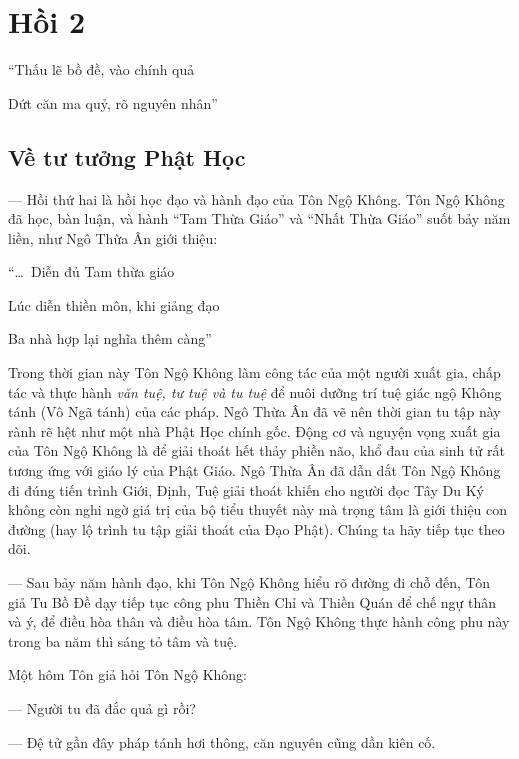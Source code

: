 \chapter{Hồi 2} %
\label{cha:hoi_2}


\begin{itshape}
``Thấu lẽ bồ đề, vào chính quả

Dứt căn ma quỷ, rõ nguyên nhân''
\end{itshape}

\section{Về tư tưởng Phật Học} %
\label{sec:2_tu_tuong_phat_hoc}

— Hồi thứ hai là hồi học đạo và hành đạo của Tôn Ngộ Không. Tôn Ngộ Không đã học, bàn luận, và hành ``Tam Thừa Giáo'' và ``Nhất Thừa Giáo'' suốt bảy năm liền, như Ngô Thừa Ân giới thiệu:

\begin{itshape}
``\ldots ~Diễn đủ Tam thừa giáo

Lúc diễn thiền môn, khi giảng đạo

Ba nhà hợp lại nghĩa thêm càng''
\end{itshape}

Trong thời gian này Tôn Ngộ Không làm công tác của một người xuất gia, chấp tác và thực hành \emph{văn tuệ, tư tuệ và tu tuệ} để nuôi dưỡng trí tuệ giác ngộ Không tánh (Vô Ngã tánh) của các pháp. Ngô Thừa Ân đã vẽ nên thời gian tu tập này rành rẽ hệt như một nhà Phật Học chính gốc. Động cơ và nguyện vọng xuất gia của Tôn Ngộ Không là để giải thoát hết thảy phiền não, khổ đau của sinh tử rất tương ứng với giáo lý của Phật Giáo. Ngô Thừa Ân đã dẫn dắt Tôn Ngộ Không đi đúng tiến trình Giới, Định, Tuệ giải thoát khiến cho người đọc Tây Du Ký không còn nghi ngờ giá trị của bộ tiểu thuyết này mà trọng tâm là giới thiệu con đường (hay lộ trình tu tập giải thoát của Đạo Phật). Chúng ta hãy tiếp tục theo dõi.

— Sau bảy năm hành đạo, khi Tôn Ngộ Không hiểu rõ đường đi chỗ đến, Tôn giả Tu Bồ Đề dạy tiếp tục công phu Thiền Chỉ và Thiền Quán để chế ngự thân và ý, để điều hòa thân và điều hòa tâm. Tôn Ngộ Không thực hành công phu này trong ba năm thì sáng tỏ tâm và tuệ.

Một hôm Tôn giả hỏi Tôn Ngộ Không:

— Người tu đã đắc quả gì rồi?

— Đệ tử gần đây pháp tánh hơi thông, căn nguyên cũng dần kiên cố.

